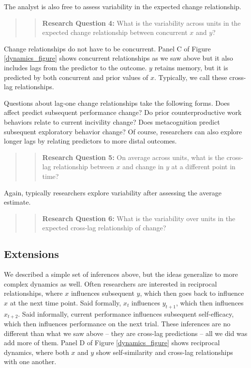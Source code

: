 \documentclass[english,,man]{apa6}
\theoremstyle{definition}
\theoremstyle{definition}
\theoremstyle{definition}
\theoremstyle{remark}
\begin{document}
The analyst is also free to assess variability in the expected change
relationship.

\begin{quote}
\begin{quote}
\textbf{Research Question 4:} What is the variability across units in
the expected change relationship between concurrent \(x\) and \(y\)?
\end{quote}
\end{quote}

Change relationships do not have to be concurrent. Panel C of Figure
\ref{dynamics_figure} shows concurrent relationships as we saw above but
it also includes lags from the predictor to the outcome. \(y\) retains
memory, but it is predicted by both concurrent and prior values of
\(x\). Typically, we call these cross-lag relationships.

Questions about lag-one change relationships take the following forms.
Does affect predict subsequent performance change? Do prior
counterproductive work behaviors relate to current incivility change?
Does metacognition predict subsequent exploratory behavior change? Of
course, researchers can also explore longer lags by relating predictors
to more distal outcomes.

\begin{quote}
\begin{quote}
\textbf{Research Question 5:} On average across units, what is the
cross-lag relationship between \(x\) and change in \(y\) at a different
point in time?
\end{quote}
\end{quote}

Again, typically researchers explore variability after assessing the
average estimate.

\begin{quote}
\begin{quote}
\textbf{Research Question 6:} What is the variability over units in the
expected cross-lag relationship of change?
\end{quote}
\end{quote}

\hypertarget{extensions}{%
\subsection{Extensions}\label{extensions}}

We described a simple set of inferences above, but the ideas generalize
to more complex dynamics as well. Often researchers are interested in
reciprocal relationships, where \(x\) influences subsequent \(y\), which
then goes back to influence \(x\) at the next time point. Said formally,
\(x_t\) influences \(y_{t+1}\), which then influences \(x_{t+2}\). Said
informally, current performance influences subsequent self-efficacy,
which then influences performance on the next trial. These inferences
are no different than what we saw above -- they are cross-lag
predictions -- all we did was add more of them. Panel D of Figure
\ref{dynamics_figure} shows reciprocal dynamics, where both \(x\) and
\(y\) show self-similarity and cross-lag relationships with one another.
\end{document}
